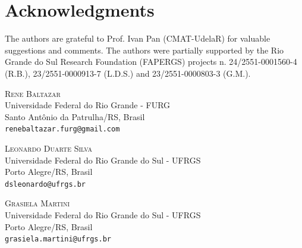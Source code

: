 \documentclass{article}
\numberwithin{equation}{section}\theoremstyle{plain}
\begin{document}
\section*{Acknowledgments}

The authors are grateful to Prof. Ivan Pan (CMAT-UdelaR) for valuable suggestions and comments.
The authors were partially supported by the Rio Grande do Sul Research Foundation (FAPERGS) projects n. 24/2551-0001560-4 (R.B.), 23/2551-0000913-7 (L.D.S.) and 23/2551-0000803-3 (G.M.).






\bigskip

\noindent
\textsc{Rene Baltazar}\\
Universidade Federal do Rio Grande - FURG\\
Santo Antônio da Patrulha/RS, Brasil\\
\texttt{renebaltazar.furg@gmail.com}

\bigskip

\noindent
\textsc{Leonardo Duarte Silva}\\
Universidade Federal do Rio Grande do Sul - UFRGS\\
Porto Alegre/RS, Brasil\\
\texttt{dsleonardo@ufrgs.br}

\bigskip

\noindent
\textsc{Grasiela Martini}\\
Universidade Federal do Rio Grande do Sul - UFRGS\\
Porto Alegre/RS, Brasil\\
\texttt{grasiela.martini@ufrgs.br}
\end{document}
